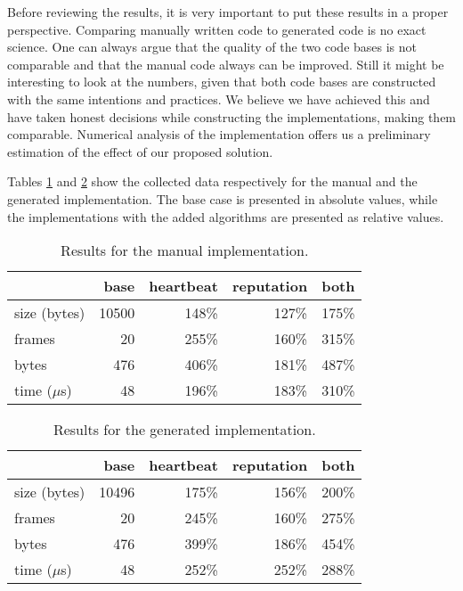 \documentclass[conference]{IEEEtran}
\begin{document}
Before reviewing the results, it is very important to put these results in a
proper perspective. Comparing manually written code to generated code is no
exact science. One can always argue that the quality of the two code bases is
not comparable and that the manual code always can be improved. Still it might
be interesting to look at the numbers, given that both code bases are
constructed with the same intentions and practices. We believe we have achieved
this and have taken honest decisions while constructing the implementations,
making them comparable. Numerical analysis of the implementation offers us a
preliminary estimation of the effect of our proposed solution.

Tables \ref{tbl:manual} and \ref{tbl:generated} show the collected data
respectively for the manual and the generated implementation. The base case is
presented in absolute values, while the implementations with the added
algorithms are presented as relative values.

\begin{table}[H]
  \centering
  \begin{tabular}{lrrrr}
  \hline
      & base & heartbeat & reputation & both\\
  \hline
  size (bytes) & 10500 & 148\% & 127\% & 175\%\\
  frames & 20 & 255\% & 160\% & 315\%\\
  bytes & 476 & 406\% & 181\% & 487\%\\
  time ($\mu$s) & 48 & 196\% & 183\% & 310\%\\
  \hline
  \end{tabular}
  \caption{Results for the manual implementation.}
  \label{tbl:manual}
\end{table}

\begin{table}[H]
  \centering
  \begin{tabular}{lrrrr}
  \hline
         & base & heartbeat & reputation & both\\
  \hline
  size (bytes) & 10496 & 175\% & 156\% & 200\%\\
  frames & 20 & 245\% & 160\% & 275\%\\
  bytes & 476 & 399\% & 186\% & 454\%\\
  time ($\mu$s) & 48 & 252\% & 252\% & 288\%\\
  \hline
  \end{tabular}
  \caption{Results for the generated implementation.}
  \label{tbl:generated}
\end{table}
\end{document}

